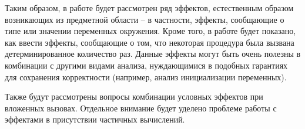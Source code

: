 Таким образом, в работе будет рассмотрен ряд эффектов, естественным образом возникающих из предметной области -- в частности, эффекты, сообщающие о типе или значении переменных окружения. Кроме того, в работе будет показано, как ввести эффекты, сообщающие о том, что некоторая процедура была вызвана детерминированное количество раз. Данные эффекты могут быть очень полезны в комбинации с другими видами анализа, нуждающимися в подобных гарантиях для сохранения корректности (например, анализ инициализации переменных).

Также будут рассмотрены вопросы комбинации условных эффектов при вложенных вызовах. Отдельное внимание будет уделено проблеме работы с эффектами в присутствии частичных вычислений.

